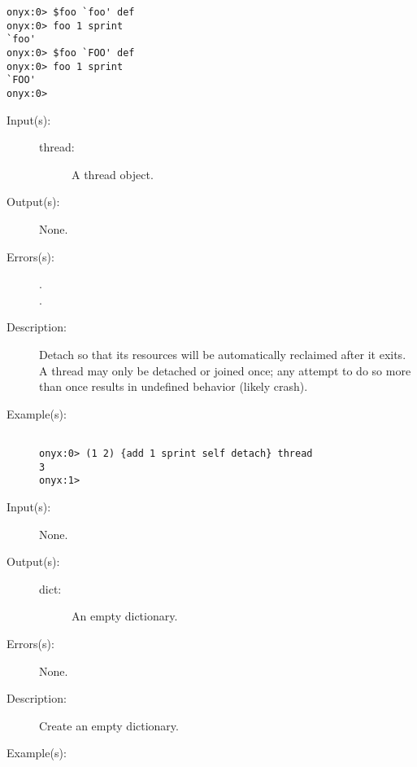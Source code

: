 \begin{description}
\begin{description}
\begin{verbatim}
onyx:0> $foo `foo' def
onyx:0> foo 1 sprint
`foo'
onyx:0> $foo `FOO' def
onyx:0> foo 1 sprint
`FOO'
onyx:0>
		\end{verbatim}
	\end{description}
\label{systemdict:detach}
\item[{\onyxop{thread}{detach}{--}}: ]
	\begin{description}\item[]
	\item[Input(s): ]
		\begin{description}\item[]
		\item[thread: ]
			A thread object.
		\end{description}
	\item[Output(s): ] None.
	\item[Errors(s): ]
		\begin{description}\item[]
		\item[.]
		\item[.]
		\end{description}
	\item[Description: ]
		Detach  so that its resources will be
		automatically reclaimed after it exits.  A thread may only be
		detached or joined once; any attempt to do so more than once
		results in undefined behavior (likely crash).
	\item[Example(s): ]\begin{verbatim}

onyx:0> (1 2) {add 1 sprint self detach} thread
3
onyx:1>
		\end{verbatim}
	\end{description}
\label{systemdict:dict}
\item[{\onyxop{--}{dict}{dict}}: ]
	\begin{description}\item[]
	\item[Input(s): ] None.
	\item[Output(s): ]
		\begin{description}\item[]
		\item[dict: ]
			An empty dictionary.
		\end{description}
	\item[Errors(s): ] None.
	\item[Description: ]
		Create an empty dictionary.
	\item[Example(s): ]\begin{verbatim}


\end{verbatim}
\end{description}
\end{description}
